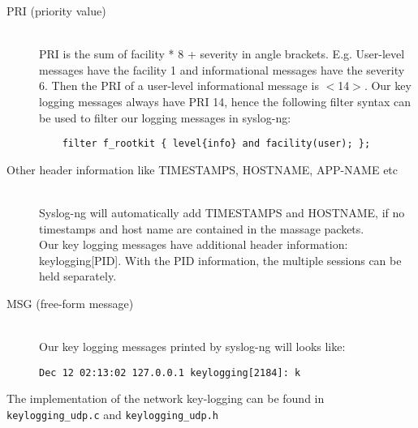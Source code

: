 \begin{description}
\item[PRI (priority value)] \hfill \\
PRI is the sum of facility * 8 + severity in angle brackets. E.g. User-level
messages have the facility 1 and informational messages have the severity 6.
Then the PRI of a user-level informational message is $<$14$>$. 
Our key logging messages  always have PRI 14, hence the following filter 
syntax can be used to filter our logging messages in syslog-ng:
\begin{center}
\lstset{escapechar=,style=customc}
	\begin{lstlisting}
  	filter f_rootkit { level{info} and facility(user); };
	\end{lstlisting}
\end{center}
\item[Other header information like TIMESTAMPS, HOSTNAME, APP-NAME etc] \hfill \\
Syslog-ng will automatically add TIMESTAMPS and HOSTNAME, if no timestamps 
and host name are contained in the massage packets.\\ 
Our key logging messages have additional header information: keylogging[PID]. 
With the PID information, the multiple sessions can be held separately.
\item[MSG (free-form message)]\hfill\\
Our key logging messages printed by syslog-ng will looks like:
\begin{center}
  	\verb+Dec 12 02:13:02 127.0.0.1 keylogging[2184]: k+
\end{center}
\end{description}
The implementation of the network key-logging can be found in 
\verb+keylogging_udp.c+ and \verb+keylogging_udp.h+\\
